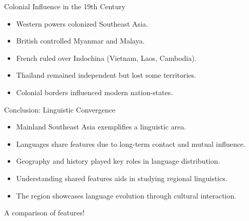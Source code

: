 \documentclass{beamer}
\begin{document}
\begin{frame}{Colonial Influence in the 19th Century}
    \begin{itemize}
        \item Western powers colonized Southeast Asia.
        \item British controlled Myanmar and Malaya.
        \item French ruled over Indochina (Vietnam, Laos, Cambodia).
        \item Thailand remained independent but lost some territories.
        \item Colonial borders influenced modern nation-states.
    \end{itemize}
\end{frame}

\begin{frame}{Conclusion: Linguistic Convergence}
    \begin{itemize}
        \item Mainland Southeast Asia exemplifies a linguistic area.
        \item Languages share features due to long-term contact and mutual influence.
        \item Geography and history played key roles in language distribution.
        \item Understanding shared features aids in studying regional linguistics.
        \item The region showcases language evolution through cultural interaction.
    \end{itemize}
\end{frame}


\begin{frame}
  \begin{center}
    \huge A comparison of features!
  \end{center}
\end{frame}
\end{document}
